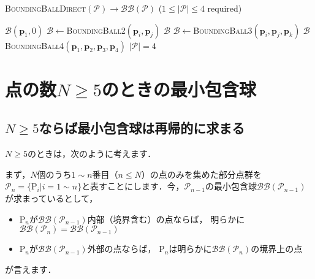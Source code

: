 ﻿\documentclass[a4paper]{jsarticle}
\begin{document}
\begin{algorithm}[h]
\caption{\textsc{BoundingBallDirect}$(\mathcal{P})\rightarrow\mathcal{BB}(\mathcal{P})$ ($1\leq|\mathcal{P}|\leq 4$ required)}
\begin{algorithmic}[1]
   $\mathcal{B}(\boldsymbol{p}_{1},0)$
\EndIf
{}
    \State $\mathcal{B}\leftarrow$\textsc{BoundingBall2}$(\boldsymbol{p}_{i},\boldsymbol{p}_{j})$
       $\mathcal{B}$
    \EndIf
  \EndFor
\EndIf
{}
    \State $\mathcal{B}\leftarrow$\textsc{BoundingBall3}$(\boldsymbol{p}_{i},\boldsymbol{p}_{j},\boldsymbol{p}_{k})$
       $\mathcal{B}$
    \EndIf
  \EndFor
\EndIf
{} \textsc{BoundingBall4}$(\boldsymbol{p}_{1},\boldsymbol{p}_{2},\boldsymbol{p}_{3},\boldsymbol{p}_{4})$
\Comment $\left|\mathcal{P}\right|=4$
\end{algorithmic}
\end{algorithm}





\section{点の数$N\geq 5$のときの最小包含球}

\subsection{$N\geq 5$ならば最小包含球は再帰的に求まる}

$N\geq 5$のときは，次のように考えます．

まず，$N$個のうち$1\sim n$番目（$n\leq N$）の点のみを集めた部分点群を$\mathcal{P}_{n}=\{\mathrm{P}_{i}|i=1\sim n\}$と表すことにします．今，$\mathcal{P}_{n-1}$の最小包含球$\mathcal{BB}(\mathcal{P}_{n-1})$が求まっているとして，
\begin{itemize}
\item $\mathrm{P}_{n}$が$\mathcal{BB}(\mathcal{P}_{n-1})$内部（境界含む）の点ならば，
明らかに$\mathcal{BB}(\mathcal{P}_{n})=\mathcal{BB}(\mathcal{P}_{n-1})$
\item $\mathrm{P}_{n}$が$\mathcal{BB}(\mathcal{P}_{n-1})$外部の点ならば，
$\mathrm{P}_{n}$は明らかに$\mathcal{BB}(\mathcal{P}_{n})$の境界上の点
\end{itemize}
が言えます．
\end{document}
